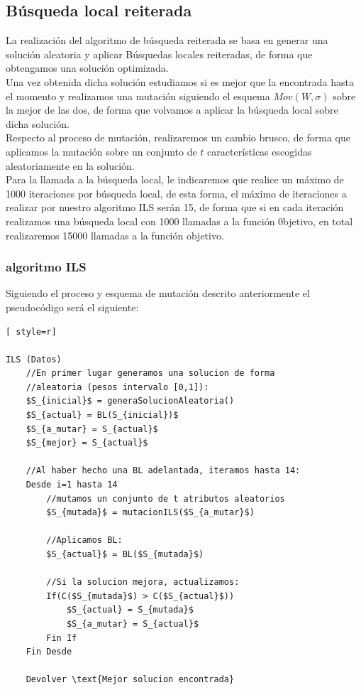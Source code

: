 \subsection{Búsqueda local reiterada}
La realización del algoritmo de búsqueda reiterada se basa en generar una solución aleatoria y aplicar Búsquedas locales reiteradas, de forma que obtengamos una solución optimizada.\\ 
Una vez obtenida dicha solución estudiamos si es mejor que la encontrada hasta el momento y realizamos una mutación siguiendo el esquema $Mov(W,\sigma)$ sobre la mejor de las dos, de forma que volvamos a aplicar la búsqueda local sobre dicha solución.\\ 

Respecto al proceso de mutación, realizaremos un cambio brusco, de forma que aplicamos la mutación sobre un conjunto de $t$ características escogidas aleatoriamente en la solución.\\ 
Para la llamada a la búsqueda local, le indicaremos que realice un máximo de 1000 iteraciones por búsqueda local, de esta forma, el máximo de iteraciones a realizar por nuestro algoritmo ILS serán 15, de forma que si en cada iteración realizamos una búsqueda local con 1000 llamadas a la función 0bjetivo, en total realizaremos 15000 llamadas a la función objetivo.

\subsubsection{algoritmo ILS}
Siguiendo el proceso y esquema de mutación descrito anteriormente el pseudocódigo será el siguiente:

\begin{lstlisting}[ style=r]

ILS (Datos)
	//En primer lugar generamos una solucion de forma
	//aleatoria (pesos intervalo [0,1]):
	$S_{inicial}$ = generaSolucionAleatoria()
	$S_{actual} = BL(S_{inicial})$
	$S_{a_mutar} = S_{actual}$
	$S_{mejor} = S_{actual}$
	
	//Al haber hecho una BL adelantada, iteramos hasta 14:
	Desde i=1 hasta 14
		//mutamos un conjunto de t atributos aleatorios
		$S_{mutada}$ = mutacionILS($S_{a_mutar}$)
		
		//Aplicamos BL:
		$S_{actual}$ = BL($S_{mutada}$)
		
		//Si la solucion mejora, actualizamos:
		If(C($S_{mutada}$) > C($S_{actual}$))
			$S_{actual} = S_{mutada}$
			$S_{a_mutar} = S_{actual}$
		Fin If
	Fin Desde
	
	Devolver \text{Mejor solucion encontrada}	
\end{lstlisting}

